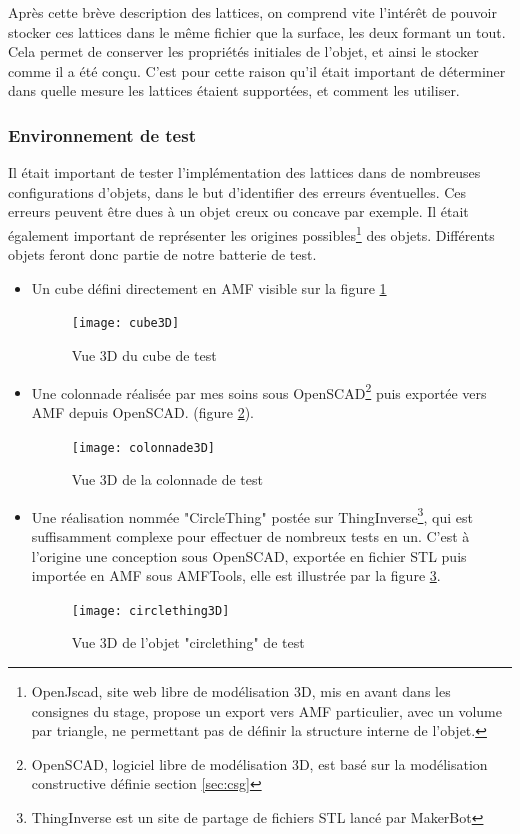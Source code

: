 \documentclass{tnreport}
\begin{document}
Après cette brève description des lattices, on comprend vite l'intérêt de pouvoir stocker ces lattices dans le même fichier que la surface, les deux formant un tout. Cela permet de conserver les propriétés initiales de l'objet, et ainsi le stocker comme il a été conçu. C'est pour cette raison qu'il était important de déterminer dans quelle mesure les lattices étaient supportées, et comment les utiliser. 
\newpage
\subsubsection{Environnement de test}
Il était important de tester l'implémentation des lattices dans de nombreuses configurations d'objets, dans le but d'identifier des erreurs éventuelles. Ces erreurs peuvent être dues à un objet creux ou concave par exemple. Il était également important de représenter les origines possibles\footnote{OpenJscad, site web libre de modélisation 3D, mis en avant dans les consignes du stage, propose un export vers AMF particulier, avec un volume par triangle, ne permettant pas de définir la structure interne de l'objet.} des objets. Différents objets feront donc partie de notre batterie de test. 
\begin{itemize}
  \item Un cube défini directement en AMF visible sur la figure \ref{fig:cube3D}
  \begin{figure}[ht]
    \centering
    \texttt{[image: cube3D]}
    \caption{Vue 3D du cube de test}
    \label{fig:cube3D}
  \end{figure}
  \item Une colonnade réalisée par mes soins sous OpenSCAD\footnote{OpenSCAD, logiciel libre de modélisation 3D, est basé sur la modélisation constructive définie section \ref{sec:csg}} puis exportée vers AMF depuis OpenSCAD. (figure \ref{fig:colonnade3D}).
  \begin{figure}[ht]
    \centering
    \texttt{[image: colonnade3D]}
    \caption{Vue 3D de la colonnade de test}
    \label{fig:colonnade3D}
  \end{figure}
  \item Une réalisation nommée "CircleThing" postée sur ThingInverse\footnote{ThingInverse est un site de partage de fichiers STL lancé par MakerBot}, qui est suffisamment complexe pour effectuer de nombreux tests en un. C'est à l'origine une conception sous OpenSCAD, exportée en fichier STL puis importée en AMF sous AMFTools, elle est illustrée par la figure \ref{fig:circlething3D}.
  \begin{figure}[ht]
    \centering
    \texttt{[image: circlething3D]}
    \caption{Vue 3D de l'objet "circlething" de test}
    \label{fig:circlething3D}
  \end{figure}
\end{itemize}
\end{document}
